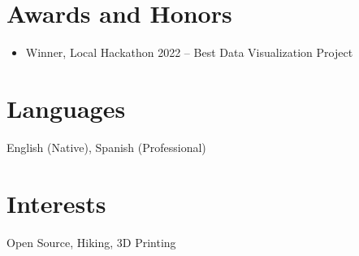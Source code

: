 \documentclass[11pt,a4paper]{article}
\begin{document}
\section*{Awards and Honors}
\begin{itemize}[leftmargin=*,noitemsep]
    \item Winner, Local Hackathon 2022 – Best Data Visualization Project
\end{itemize}

\section*{Languages}
English (Native), Spanish (Professional)

\section*{Interests}
Open Source, Hiking, 3D Printing

\end{document}
